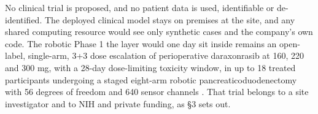 No clinical trial is proposed, and no patient data is used, identifiable or
de-identified. The deployed clinical model stays on premises at the site, and
any shared computing resource would see only synthetic cases and the company's
own code. The robotic Phase 1 the layer would one day sit inside remains an
open-label, single-arm, 3+3 dose escalation of perioperative daraxonrasib at
160, 220 and 300 mg, with a 28-day dose-limiting toxicity window, in up to 18
treated participants undergoing a staged eight-arm robotic
pancreaticoduodenectomy with 56 degrees of freedom and 640 sensor channels
\cite{onpremwhippl}. That trial belongs to a site investigator and to NIH and
private funding, as \S3 sets out.
